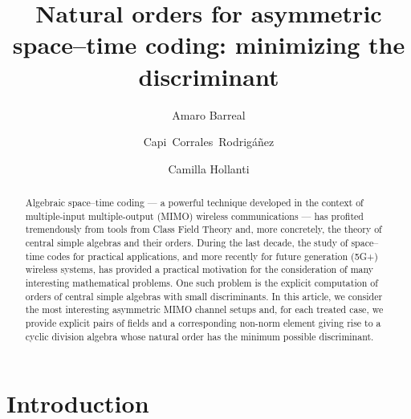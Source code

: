\documentclass[smallextended]{svjour3}
\begin{document}
\title{Natural orders for asymmetric space--time coding: minimizing the discriminant}

\author{Amaro Barreal \and Capi~Corrales~Rodrig\'{a}\~{n}ez \and Camilla Hollanti}


\maketitle 

\begin{abstract}
Algebraic space--time coding --- a powerful technique developed in the context of multiple-input multiple-output (MIMO) wireless communications --- has profited tremendously from tools from Class Field Theory and, more concretely, the theory of central simple algebras and their orders. During  the last decade, the study of space--time codes for practical applications, and more recently for future generation (5G+) wireless systems, has provided a practical motivation for the consideration of many interesting mathematical problems. 
One such problem is the explicit computation of orders of central simple algebras with small discriminants. In this article, we consider the most interesting asymmetric MIMO channel setups and, for each treated case, we provide explicit pairs of fields and a corresponding non-norm element giving rise to a cyclic division algebra whose natural order has the minimum possible discriminant. 

\end{abstract}



\section{Introduction}
\label{sec:intro}
\end{document}
